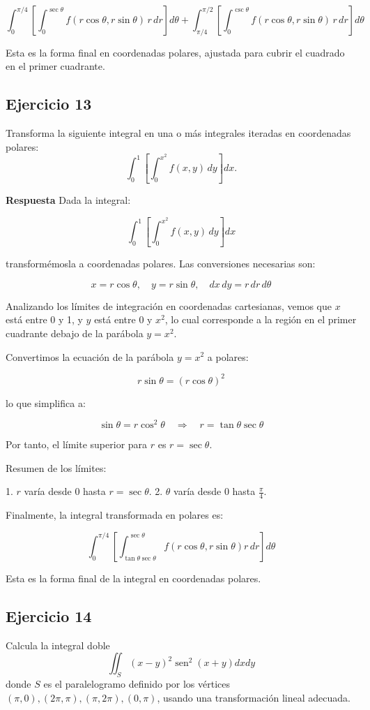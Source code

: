 \documentclass{report}
\begin{document}
\[
\boxed{\int_{0}^{\pi/4} \left[\int_{0}^{\sec{\theta}} f\left(r \cos \theta, r \sin \theta\right) \, r \, dr \right] d\theta 
+ 
\int_{\pi/4}^{\pi/2} \left[\int_{0}^{\csc{\theta}} f\left(r \cos \theta, r \sin \theta\right) \, r \, dr \right] d\theta}
\]

Esta es la forma final en coordenadas polares, ajustada para cubrir el cuadrado en el primer cuadrante.\subsection{Ejercicio 13}
Transforma la siguiente integral en una o más integrales iteradas en coordenadas polares:
$$\int_{0}^{1}\left[\int_{0}^{x^{2}} f(x, y) \, dy\right] dx.$$

\textbf{Respuesta}
Dada la integral:

\[
\int_{0}^{1} \left[\int_{0}^{x^2} f(x, y) \, dy\right] dx
\]

transformémosla a coordenadas polares. Las conversiones necesarias son:

\[
x = r \cos \theta, \quad y = r \sin \theta, \quad dx \, dy = r \, dr \, d\theta
\]

Analizando los límites de integración en coordenadas cartesianas, vemos que \(x\) está entre 0 y 1, y \(y\) está entre 0 y \(x^2\), lo cual corresponde a la región en el primer cuadrante debajo de la parábola \(y = x^2\).

Convertimos la ecuación de la parábola \(y = x^2\) a polares:

\[
r \sin \theta = (r \cos \theta)^2
\]

lo que simplifica a:

\[
\sin \theta = r \cos^2 \theta \quad \Rightarrow \quad r = \tan \theta \sec \theta
\]

Por tanto, el límite superior para \(r\) es \(r = \sec \theta\).

Resumen de los límites:

1. \(r\) varía desde 0 hasta \(r = \sec \theta\).
2. \(\theta\) varía desde 0 hasta \(\frac{\pi}{4}\).

Finalmente, la integral transformada en polares es:

\[
\boxed{\int_{0}^{\pi/4} \left[\int_{\tan \theta \sec \theta}^{\sec \theta} f(r \cos \theta, r \sin \theta) r \, dr \right] d\theta}
\]

Esta es la forma final de la integral en coordenadas polares.\subsection{Ejercicio 14}
Calcula la integral doble 
$$
\iint_{S}(x-y)^{2} \operatorname{sen}^{2}(x+y) d x d y
$$
donde $S$ es el paralelogramo definido por los vértices $(\pi, 0),(2 \pi, \pi),(\pi, 2 \pi),(0, \pi)$, usando una transformación lineal adecuada.
\end{document}
